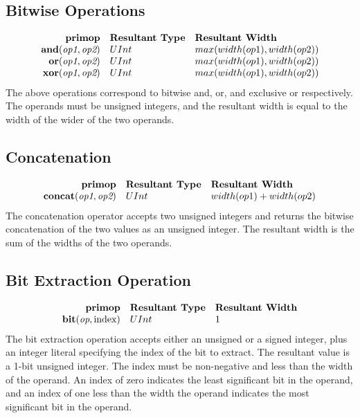 \documentclass[12pt]{article}
\begin{document}
\subsection{Bitwise Operations}
\[
\begin{array}{rll}
\text{\bf primop} & \text{\bf Resultant Type} & \text{\bf Resultant Width} \\
\text{\bf and}     (\text{\em op1}, \text{\em op2}) & UInt & max(width(op1),width(op2))    \\
\text{\bf or}      (\text{\em op1}, \text{\em op2}) & UInt & max(width(op1),width(op2))    \\
\text{\bf xor}     (\text{\em op1}, \text{\em op2}) & UInt & max(width(op1),width(op2))    \\
\end{array}
\]
The above operations correspond to bitwise and, or, and exclusive or respectively.
The operands must be unsigned integers, and the resultant width is equal to the width of the wider of the two operands. 

\subsection{Concatenation}
\[
\begin{array}{rll}
\text{\bf primop} & \text{\bf Resultant Type} & \text{\bf Resultant Width} \\
\text{\bf concat}(\text{\em op1}, \text{\em op2})  & UInt & width(op1) + width(op2)    \\
\end{array}
\]
The concatenation operator accepts two unsigned integers and returns the bitwise concatenation of the two values as an unsigned integer.
The resultant width is the sum of the widths of the two operands.

\subsection{Bit Extraction Operation}
\[
\begin{array}{rll}
\text{\bf primop} & \text{\bf Resultant Type} & \text{\bf Resultant Width} \\
\text{\bf bit}(\text{\em op}, \text{index})  & UInt & 1    \\
\end{array}
\]
The bit extraction operation accepts either an unsigned or a signed integer, plus an integer literal specifying the index of the bit to extract.
The resultant value is a 1-bit unsigned integer.
The index must be non-negative and less than the width of the operand.
An index of zero indicates the least significant bit in the operand, and an index of one less than the width the operand indicates the most significant bit in the operand.
\end{document}
